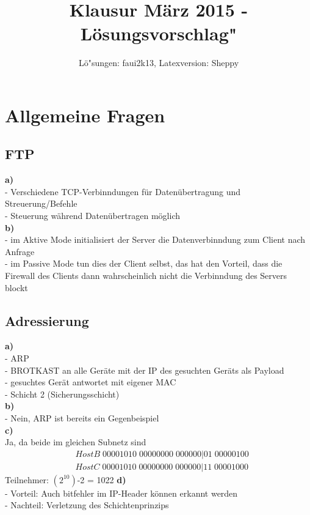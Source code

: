\documentclass{article}
\title{Klausur M\"arz 2015 - L\"osungsvorschlag"}
\author{L\"o"sungen: faui2k13, Latexversion: Sheppy}
\begin{document}
	\maketitle
	\section{Allgemeine Fragen}
		\subsection{FTP}
			\textbf{a)}\\
				- Verschiedene TCP-Verbinndungen f\"ur Daten\"ubertragung und Streuerung/Befehle\\
				- Steuerung w\"ahrend Daten\"ubertragen m\"oglich\\
			\textbf{b)}\\
				- im Aktive Mode initialisiert der Server die Datenverbinndung zum Client nach Anfrage\\
				- im Passive Mode tun dies der Client selbst, das hat den Vorteil, dass die Firewall des Clients dann wahrscheinlich nicht die Verbinndung des Servers blockt\\
		\subsection{Adressierung}
			\textbf{a)}\\
				- ARP \\
				- BROTKAST an alle Ger\"ate mit der IP des gesuchten Ger\"ats als Payload\\
				- gesuchtes Ger\"at antwortet mit eigener MAC\\
				- Schicht 2 (Sicherungsschicht)\\
			\textbf{b)}\\
				- Nein, ARP ist bereits ein Gegenbeispiel\\
			\textbf{c)}\\
				Ja, da beide im gleichen Subnetz sind
				\begin{align*}
					&HostB\;00001010\;00000000\;000000|01\;00000100 \\
					&HostC\;00001010\;00000000\;000000|11\;00001000
				\end{align*}
				Teilnehmer: $(2^10)$-2 = 1022
			\textbf{d)}\\
				- Vorteil: Auch bitfehler im IP-Header k\"onnen erkannt werden\\
				- Nachteil: Verletzung des Schichtenprinzips
\end{document}

